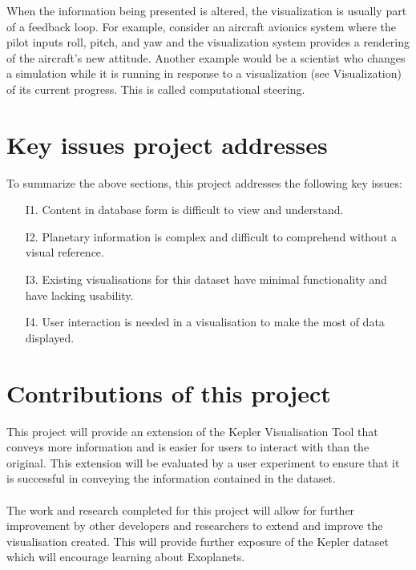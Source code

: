 When the information being presented is altered, the visualization is usually part of a feedback loop. For example, consider an aircraft avionics system where the pilot inputs roll, pitch, and yaw and the visualization system provides a rendering of the aircraft's new attitude. Another example would be a scientist who changes a simulation while it is running in response to a visualization (see Visualization) of its current progress. This is called computational steering.

\section{Key issues project addresses}
To summarize the above sections, this project addresses the following key issues:
\begin{enumerate}
 \item[I1.] Content in database form is difficult to view and understand.
 \item[I2.] Planetary information is complex and difficult to comprehend without a visual reference.
 \item[I3.] Existing visualisations for this dataset have minimal functionality and have lacking usability.
 \item[I4.] User interaction is needed in a visualisation to make the most of data displayed.
\end{enumerate}

\section{Contributions of this project}
This project will provide an extension of the Kepler Visualisation Tool \cite{kepler_github} that conveys more information and is easier for users to interact with than the original. This extension will be evaluated by a user experiment to ensure that it is successful in conveying the information contained in the dataset.
\\\\
The work and research completed for this project will allow for further improvement by other developers and researchers to extend and improve the visualisation created. This will provide further exposure of the Kepler dataset which will encourage learning about Exoplanets.
